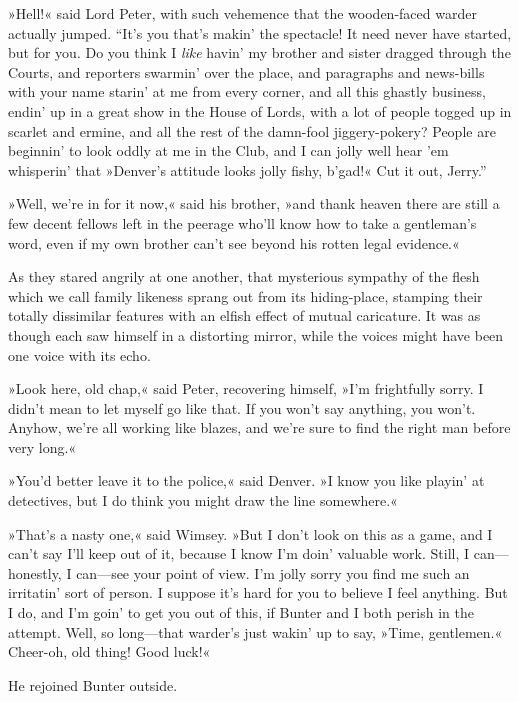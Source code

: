 »Hell!« said Lord Peter, with such vehemence that the wooden-faced warder actually jumped. \enquote{It's you that's makin' the spectacle! It need never have started, but for you. Do you think I \textit{like} havin' my brother and sister dragged through the Courts, and reporters swarmin' over the place, and paragraphs and news-bills with your name starin' at me from every corner, and all this ghastly business, endin' up in a great show in the House of Lords, with a lot of people togged up in scarlet and ermine, and all the rest of the damn-fool jiggery-pokery? People are beginnin' to look oddly at me in the Club, and I can jolly well hear 'em whisperin' that »Denver's attitude looks jolly fishy, b'gad!« Cut it out, Jerry.}

»Well, we're in for it now,« said his brother, »and thank heaven there are still a few decent fellows left in the peerage who'll know how to take a gentleman's word, even if my own brother can't see beyond his rotten legal evidence.«

As they stared angrily at one another, that mysterious sympathy of the flesh which we call family likeness sprang out from its hiding-place, stamping their totally dissimilar features with an elfish effect of mutual caricature. It was as though each saw himself in a distorting mirror, while the voices might have been one voice with its echo.

»Look here, old chap,« said Peter, recovering himself, »I'm frightfully sorry. I didn't mean to let myself go like that. If you won't say anything, you won't. Anyhow, we're all working like blazes, and we're sure to find the right man before very long.«

»You'd better leave it to the police,« said Denver. »I know you like playin' at detectives, but I do think you might draw the line somewhere.«

»That's a nasty one,« said Wimsey. »But I don't look on this as a game, and I can't say I'll keep out of it, because I know I'm doin' valuable work. Still, I can\allowbreak---\allowbreak honestly, I can\allowbreak---\allowbreak see your point of view. I'm jolly sorry you find me such an irritatin' sort of person. I suppose it's hard for you to believe I feel anything. But I do, and I'm goin' to get you out of this, if Bunter and I both perish in the attempt. Well, so long\allowbreak---\allowbreak that warder's just wakin' up to say, »Time, gentlemen.« Cheer-oh, old thing! Good luck!«

He rejoined Bunter outside.

